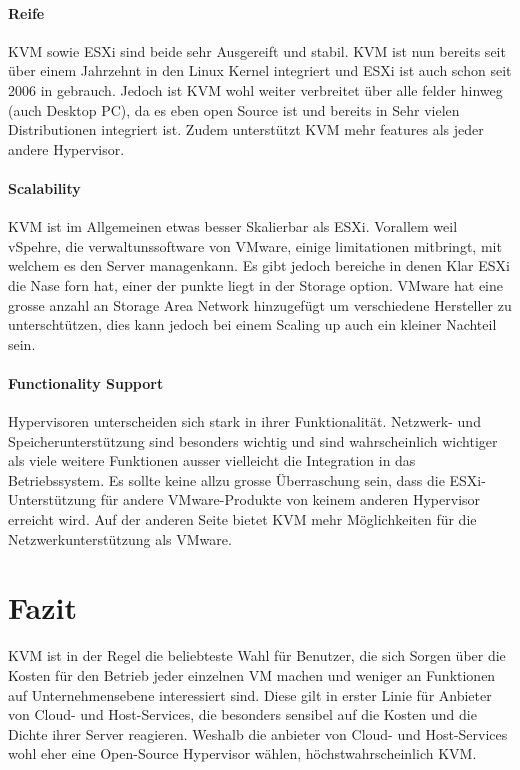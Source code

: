 \documentclass[14pt]{extreport}
\begin{document}
\subsubsection{Reife}

KVM sowie ESXi sind beide sehr Ausgereift und stabil. KVM ist nun bereits seit über einem Jahrzehnt in den Linux Kernel integriert und ESXi ist auch schon seit 2006 in gebrauch. Jedoch ist KVM wohl weiter verbreitet über alle felder hinweg (auch Desktop PC), da es eben open Source ist und bereits in Sehr vielen Distributionen integriert ist. Zudem unterstützt KVM mehr features als jeder andere Hypervisor. \cite{website:vergleich}

\subsubsection{Scalability}

KVM ist im Allgemeinen etwas besser Skalierbar als ESXi. Vorallem weil vSpehre, die verwaltunssoftware von VMware, einige limitationen mitbringt, mit welchem es den Server managenkann. Es gibt jedoch bereiche in denen Klar ESXi die Nase forn hat, einer der punkte liegt in der Storage option. VMware hat eine grosse anzahl an Storage Area Network hinzugefügt um verschiedene Hersteller zu unterschtützen, dies kann jedoch bei einem Scaling up auch ein kleiner Nachteil sein. \cite{website:vergleich}

\subsubsection{Functionality Support}

Hypervisoren unterscheiden sich stark in ihrer Funktionalität. Netzwerk- und Speicherunterstützung sind besonders wichtig und sind wahrscheinlich wichtiger als viele weitere Funktionen ausser vielleicht die Integration in das Betriebssystem. Es sollte keine allzu grosse Überraschung sein, dass die ESXi-Unterstützung für andere VMware-Produkte von keinem anderen Hypervisor erreicht wird. Auf der anderen Seite bietet KVM mehr Möglichkeiten für die Netzwerkunterstützung als VMware. \cite{website:vergleich}

\chapter{Fazit}
KVM ist in der Regel die beliebteste Wahl für Benutzer, die sich Sorgen über die Kosten für den Betrieb jeder einzelnen VM machen und weniger an Funktionen auf Unternehmensebene interessiert sind. Diese gilt in erster Linie für Anbieter von Cloud- und Host-Services, die besonders sensibel auf die Kosten und die Dichte ihrer Server reagieren. Weshalb die anbieter von Cloud- und Host-Services wohl eher eine Open-Source Hypervisor wählen, höchstwahrscheinlich KVM.
\end{document}
